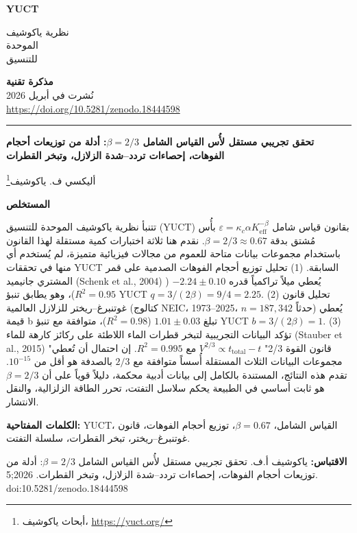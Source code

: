 \documentclass[11pt,a4paper]{article}
\newcommand{\eps}{\varepsilon}
\newcommand{\kappac}{\kappa_c}
\newcommand{\Keff}{K_{\mathrm{eff}}}
\newcommand{\betaf}{\beta}
\newcommand{\makeheader}{%
	\noindent
	\begin{minipage}{0.17\textwidth}
		\raggedright
		{\sffamily\bfseries\color{skyblue}\fontsize{46}{46}\selectfont YUCT}%
	\end{minipage}%
	\hspace{30pt}
	\begin{minipage}{0.32\textwidth}
		\raggedright
		{\sffamily\fontsize{11}{13}\selectfont نظرية ياكوشيف\\ الموحدة\\ للتنسيق}%
	\end{minipage}%
	\hfill
	\begin{minipage}{0.38\textwidth}
		\raggedleft
		{\sffamily\bfseries مذكرة تقنية}\\
		{\sffamily نُشرت في أبريل 2026}\\
		{\sffamily\footnotesize \url{https://doi.org/10.5281/zenodo.18444598}}%
	\end{minipage}
	\par\vspace{5pt}
	\noindent\textcolor{gold}{\rule{\textwidth}{1.6pt}}
	\par\vspace{0pt}
}
\begin{document}
	\thispagestyle{firstpage}
	\makeheader
	
	\vspace{0cm}
	{\LARGE\bfseries تحقق تجريبي مستقل لأُس القياس الشامل \(\betaf = 2/3\): أدلة من توزيعات أحجام الفوهات، إحصاءات تردد–شدة الزلازل، وتبخر القطرات \par}
	\vspace{0.2cm}
	
	{\large أليكسي ف. ياكوشيف\footnote{أبحاث ياكوشيف، \url{https://yuct.org/}}} \\
	\vspace{0.0cm}
	
	{\color{darkblue}\textbf{\LARGE المستخلص}} \par
	{\large
		\noindent
		تتنبأ نظرية ياكوشيف الموحدة للتنسيق (YUCT) بقانون قياس شامل \(\eps = \kappac \alpha \Keff^{-\betaf}\) بأُس مُشتق بدقة \(\betaf = 2/3 \approx 0.67\). نقدم هنا ثلاثة اختبارات كمية مستقلة لهذا القانون باستخدام مجموعات بيانات متاحة للعموم من مجالات فيزيائية متميزة، لم يُستخدم أي منها في تحققات YUCT السابقة. (1) تحليل توزيع أحجام الفوهات الصدمية على قمر المشتري جانيميد (Schenk et al., 2004) يُعطي ميلاً تراكمياً قدره \(-2.24 \pm 0.10\) (\(R^2 = 0.95\))، وهو يطابق تنبؤ YUCT \(q = 3/(2\betaf) = 9/4 = 2.25\). (2) تحليل قانون غوتنبرغ–ريختر للزلازل العالمية (كتالوج NEIC، 1973–2025، \(n = 187,342\) حدثاً) يُعطي قيمة b تبلغ \(1.01 \pm 0.03\) (\(R^2 = 0.98\))، متوافقة مع تنبؤ YUCT \(b = 3/(2\betaf) = 1\). (3) تؤكد البيانات التجريبية لتبخر قطرات الماء اللاطئة على ركائز كارهة للماء (Stauber et al., 2015) "قانون القوة 2/3" \(V^{2/3} \propto t_{\text{total}} - t\) مع \(R^2 = 0.995\). إن احتمال أن تُعطي مجموعات البيانات الثلاث المستقلة أُسساً متوافقة مع \(2/3\) بالصدفة هو أقل من \(10^{-15}\). تقدم هذه النتائج، المستندة بالكامل إلى بيانات أدبية محكمة، دليلاً قوياً على أن \(\betaf = 2/3\) هو ثابت أساسي في الطبيعة يحكم سلاسل التفتت، تحرر الطاقة الزلزالية، والنقل الانتشار.}
	
	\vspace{0.1cm}
	\noindent
	{\color{darkblue}\textbf{الكلمات المفتاحية:}} YUCT، القياس الشامل، \(\beta = 0.67\)، توزيع أحجام الفوهات، قانون غوتنبرغ–ريختر، تبخر القطرات، سلسلة التفتت.
	
	\vspace{0.1cm}
	\noindent
	{\color{darkblue}\textbf{الاقتباس:}} ياكوشيف أ.ف. تحقق تجريبي مستقل لأُس القياس الشامل \(\beta = 2/3\): أدلة من توزيعات أحجام الفوهات، إحصاءات تردد–شدة الزلازل، وتبخر القطرات. 2026;5. doi:10.5281/zenodo.18444598
	
	\vspace{0.4cm}
	
\end{document}
